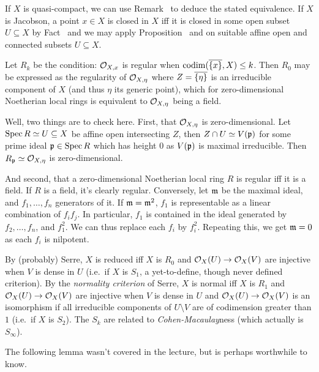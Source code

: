 \documentclass[a4paper,parskip=half,numbers=enddot, DIV=12]{scrreprt}
\begin{document}
\begin{rem*}
\begin{alphanumerate}
         If $X$ is quasi-compact, we can use Remark~ to deduce the stated equivalence. If $X$ is Jacobson, a point $x\in X$ is closed in $X$ iff it is closed in some open subset $U\subseteq X$ by Fact~ and we may apply Proposition~ and  on suitable affine open and connected subsets $U\subseteq X$.
    \item 
        Let $R_k$ be the condition: $\mathcal{O}_{X,x}$ is regular when $\operatorname{codim}(\overline{\{x\}}, X) \leq k$. Then $R_0$ may be expressed as the regularity of $\mathcal{O}_{X,\eta}$ where $Z=\overline{\left\{\eta\right\}}$ is an irreducible component of $X$ (and thus $\eta$ its generic point), which for zero-dimensional Noetherian local rings is equivalent to $\mathcal{O}_{X,\eta}$ being a field. 
        
        Well, two things are to check here. First, that $\mathcal{O}_{X,\eta}$ is zero-dimensional. Let $\operatorname{Spec} R\simeq U\subseteq X$ be affine open intersecting $Z$, then $Z\cap U\simeq V(\mathfrak{p})$ for some prime ideal $\mathfrak{p}\in\operatorname{Spec} R$ which has height $0$ as $V(\mathfrak{p})$ is maximal irreducible. Then $R_{\mathfrak{p}}\simeq \mathcal{O}_{X,\eta}$ is zero-dimensional.  
        
        And second, that a zero-dimensional Noetherian local ring $R$ is regular iff it is a field. If $R$ is a field, it's clearly regular. Conversely, let $\mathfrak{m}$ be the maximal ideal, and $f_1,\ldots,f_n$ generators of it. If $\mathfrak{m}=\mathfrak{m}^2$, $f_1$ is representable as a linear combination of $f_if_j$. In particular, $f_1$ is contained in the ideal generated by $f_2,\ldots,f_n$, and $f_1^2$. We can thus replace each $f_i$ by $f_i^2$. Repeating this, we get $\mathfrak{m}=0$ as each $f_i$ is nilpotent.
        
          By (probably) Serre, $X$ is reduced iff $X$ is $R_0$ and $\Oo_X(U)\morphism \Oo_X(V)$ are injective when $V$ is dense in $U$ (i.e.\ if $X$ is $S_1$, a yet-to-define, though never defined criterion). By the \emph{normality criterion} of Serre, $X$ is normal iff $X$ is $R_1$ and $\Oo_X(U)\morphism \Oo_X(V)$ are injective when $V$ is dense in $U$ and $\Oo_X(U)\morphism \Oo_X(V)$ is an isomorphism if all irreducible components of $U\setminus V$ are of codimension greater than $1$ (i.e.\ if $X$ is $S_2$). The $S_k$ are related  to \emph{Cohen-Macaulay}ness (which actually is $S_\infty$).
    \end{alphanumerate}
\end{rem*}
The following lemma wasn't covered in the lecture, but is perhaps worthwhile to know.
\end{document}
